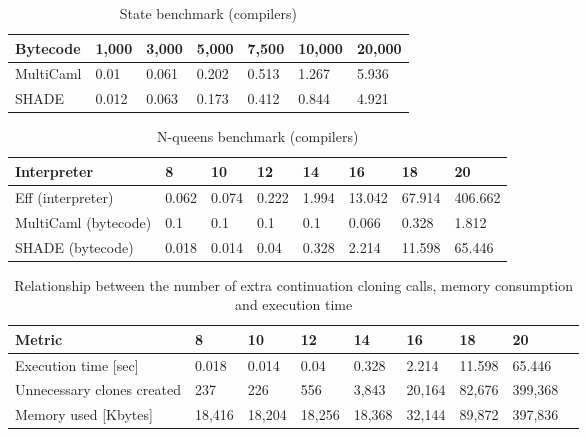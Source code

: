 %
\begin{table}[h]
\footnotesize
\centering
{\renewcommand{\arraystretch}{1.3}
\begin{tabular}{lllllll}
    \toprule
    Bytecode & 1,000 & 3,000 & 5,000 & 7,500 & 10,000 & 20,000 \\
    \midrule
    MultiCaml & 0.01 & 0.061 & 0.202 & 0.513 & 1.267 & 5.936 \\
    SHADE & 0.012 & 0.063 & 0.173 & 0.412 & 0.844 & 4.921 \\
    \bottomrule
\end{tabular}}
\caption{State benchmark (compilers)}
\label{tab:comp-state-measurements}
\end{table}
%
\begin{table}[h]
\footnotesize
\centering
{\renewcommand{\arraystretch}{1.3}
\begin{tabular}{llllllll}
    \toprule
    Interpreter & 8 & 10 & 12 & 14 & 16 & 18 & 20 \\
    \midrule
    Eff (interpreter) & 0.062 & 0.074 & 0.222 & 1.994 & 13.042 & 67.914 & 406.662 \\
    MultiCaml (bytecode) & 0.1 & 0.1 & 0.1 & 0.1 & 0.066 & 0.328 & 1.812 \\
    SHADE (bytecode) & 0.018 & 0.014 & 0.04 & 0.328 & 2.214 & 11.598 & 65.446 \\
    \bottomrule
\end{tabular}}
\caption{N-queens benchmark (compilers)}
\label{tab:nqueens-comp-measurements}
\end{table}
%
\begin{table}[h]
\footnotesize
\centering
{\renewcommand{\arraystretch}{1.3}
\begin{tabular}{lllllllll}
    \toprule
    Metric & 8 & 10 & 12 & 14 & 16 & 18 & 20 \\
    \midrule
    Execution time [sec]              & 0.018 & 0.014 & 0.04 & 0.328 & 2.214 & 11.598 & 65.446 \\
    Unnecessary clones created  & 237 & 226 & 556 & 3,843 & 20,164 & 82,676 & 399,368 \\
    Memory used [Kbytes]                 & 18,416 & 18,204 & 18,256 & 18,368 & 32,144 & 89,872 & 397,836 \\
    \bottomrule
\end{tabular}}
\caption[Overhead from continuation cloning]{Relationship between the number of extra continuation cloning calls, memory consumption and execution time}
\label{tab:cloning}
\end{table}
